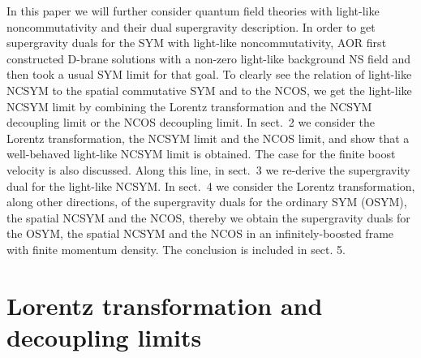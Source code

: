 \documentclass[a4paper,12pt]{article}
\providecommand{\sect}[1]{\setcounter{equation}{0}\section{#1}}
\begin{document}
In this paper we will further consider quantum field theories with light-like
noncommutativity and their dual supergravity description. In order to get
supergravity duals for the SYM with light-like noncommutativity,
AOR first constructed D\coordHE{}-brane solutions with
a non-zero light-like background NS \coordHE{} field and then took a usual SYM
limit for that goal. To clearly see the relation of light-like
NCSYM to the spatial commutative SYM and to the NCOS, we get the
light-like NCSYM limit by combining the Lorentz transformation and the
NCSYM decoupling limit or the NCOS decoupling limit. In sect.~2
we consider the Lorentz transformation, the NCSYM limit and the NCOS
limit, and show that a well-behaved light-like NCSYM limit is obtained.
The case for the finite boost velocity is also discussed. Along this
line, in sect.~3 we re-derive the supergravity dual for the light-like
NCSYM. In sect.~4 we consider the Lorentz transformation, along other
directions, of the supergravity duals for the ordinary SYM (OSYM),
the spatial NCSYM and the NCOS, thereby we obtain the supergravity duals
for the OSYM, the spatial NCSYM and the NCOS in an
infinitely-boosted frame with finite momentum density. The conclusion is
included in sect. 5.



\sect{Lorentz transformation and decoupling limits }
\end{document}

